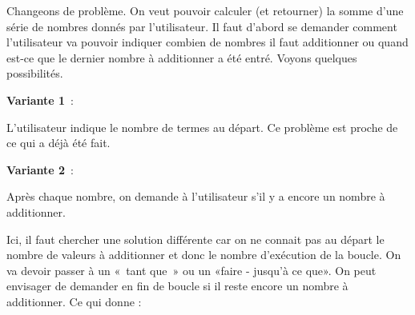 		Changeons de problème. On veut pouvoir calculer (et retourner)
		la somme d'une série de nombres donnés par
		l'utilisateur. Il faut d'abord se
		demander comment l'utilisateur va pouvoir indiquer
		combien de nombres il faut additionner ou quand est-ce que le dernier
		nombre à additionner a été entré. Voyons quelques possibilités.

		\medskip
		\textbf{Variante 1}~: 
		
		L'utilisateur indique le nombre de termes au départ.
		Ce problème est proche de ce qui a déjà été fait.
		

		\medskip
		\textbf{Variante 2}~: 
		
		Après chaque nombre, 
		on demande à l'utilisateur s'il y a encore un nombre à additionner.

		Ici, il faut chercher une solution différente
		car on ne connait pas au départ le nombre de valeurs à additionner et
		donc le nombre d'exécution de la boucle. On va devoir passer à un
		«~tant que~» ou un «faire - jusqu'à ce que». On peut
		envisager de demander en fin de boucle si il reste
		encore un nombre à additionner. Ce qui donne :

		
